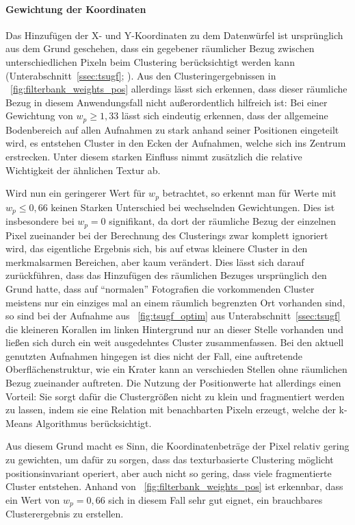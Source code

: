 \paragraph{Gewichtung der Koordinaten}
Das Hinzufügen der X- und Y-Koordinaten zu dem Datenwürfel ist ursprünglich aus dem Grund geschehen, dass ein gegebener räumlicher Bezug zwischen unterschiedlichen Pixeln beim Clustering berücksichtigt werden kann (\vgl Unterabschnitt~\ref{ssec:tsugf}; \cite{jain_91}). Aus den Clusteringergebnissen in \figurename~\ref{fig:filterbank_weights_pos} allerdings lässt sich erkennen, dass dieser räumliche Bezug in diesem Anwendungsfall nicht außerordentlich hilfreich ist: Bei einer Gewichtung von $w_p\geq1,33$ lässt sich eindeutig erkennen, dass der allgemeine Bodenbereich auf allen Aufnahmen zu stark anhand seiner Positionen eingeteilt wird, es entstehen Cluster in den Ecken der Aufnahmen, welche sich ins Zentrum erstrecken. Unter diesem starken Einfluss nimmt zusätzlich die relative Wichtigkeit der ähnlichen Textur ab.

Wird nun ein geringerer Wert für $w_p$ betrachtet, so erkennt man für Werte mit $w_p\leq0,66$ keinen Starken Unterschied bei wechselnden Gewichtungen. Dies ist insbesondere bei $w_p=0$ signifikant, da dort der räumliche Bezug der einzelnen Pixel zueinander bei der Berechnung des Clusterings zwar komplett ignoriert wird, das eigentliche Ergebnis sich, bis auf etwas kleinere Cluster in den merkmalsarmen Bereichen, aber kaum verändert. Dies lässt sich darauf zurückführen, dass das Hinzufügen des räumlichen Bezuges ursprünglich den Grund hatte, dass auf \enquote{normalen} Fotografien die vorkommenden Cluster meistens nur ein einziges mal an einem räumlich begrenzten Ort vorhanden sind, so sind \zB bei der Aufnahme aus \figurename~\ref{fig:tsugf_optim} aus Unterabschnitt~\ref{ssec:tsugf} die kleineren Korallen im linken Hintergrund nur an dieser Stelle vorhanden und ließen sich durch ein weit ausgedehntes Cluster zusammenfassen. Bei den aktuell genutzten Aufnahmen hingegen ist dies nicht der Fall, eine auftretende Oberflächenstruktur, wie \zB ein Krater kann an verschieden Stellen ohne räumlichen Bezug zueinander auftreten.
Die Nutzung der Positionwerte hat allerdings einen Vorteil: Sie sorgt dafür die Clustergrößen nicht zu klein und fragmentiert werden zu lassen, indem sie eine Relation mit benachbarten Pixeln erzeugt, welche der k-Means Algorithmus berücksichtigt.

Aus diesem Grund macht es Sinn, die Koordinatenbeträge der Pixel relativ gering zu gewichten, um dafür zu sorgen, dass das texturbasierte Clustering möglicht positionsinvariant operiert, aber auch nicht so gering, dass viele fragmentierte Cluster entstehen. Anhand von \figurename~\ref{fig:filterbank_weights_pos} ist erkennbar, dass ein Wert von  $w_p=0,66$ sich in diesem Fall sehr gut eignet, ein brauchbares Clusterergebnis zu erstellen.

